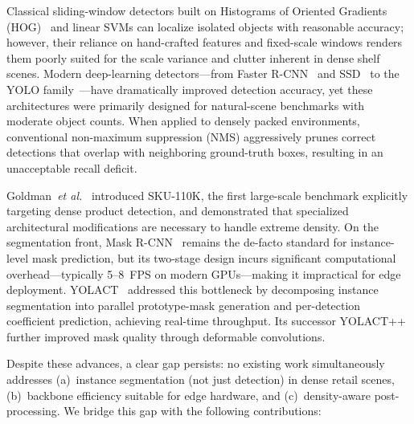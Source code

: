\documentclass[conference]{IEEEtran}
\newcommand{\etal}{\emph{et al.}}
\begin{document}
Classical sliding-window detectors built on Histograms of Oriented
Gradients (HOG)~\cite{dalal2005hog} and linear SVMs can localize isolated
objects with reasonable accuracy; however, their reliance on hand-crafted
features and fixed-scale windows renders them poorly suited for the
scale variance and clutter inherent in dense shelf scenes. Modern
deep-learning detectors---from Faster R-CNN~\cite{ren2015faster} and
SSD~\cite{liu2016ssd} to the YOLO family~\cite{redmon2016yolo}---have
dramatically improved detection accuracy, yet these architectures were
primarily designed for natural-scene benchmarks with moderate object
counts. When applied to densely packed environments, conventional
non-maximum suppression (NMS) aggressively prunes correct detections that
overlap with neighboring ground-truth boxes, resulting in an unacceptable
recall deficit.

Goldman~\etal~\cite{goldman2019dense} introduced SKU-110K, the first
large-scale benchmark explicitly targeting dense product detection, and
demonstrated that specialized architectural modifications are necessary to
handle extreme density. On the segmentation front, Mask
R-CNN~\cite{he2017mask} remains the de-facto standard for instance-level
mask prediction, but its two-stage design incurs significant computational
overhead---typically 5--8~FPS on modern GPUs---making it impractical for
edge deployment. YOLACT~\cite{bolya2019yolact} addressed this bottleneck
by decomposing instance segmentation into parallel prototype-mask
generation and per-detection coefficient prediction, achieving real-time
throughput. Its successor YOLACT++~\cite{bolya2020yolact} further improved
mask quality through deformable convolutions.

Despite these advances, a clear gap persists: no existing work
simultaneously addresses (a)~instance segmentation (not just detection) in
dense retail scenes, (b)~backbone efficiency suitable for edge hardware,
and (c)~density-aware post-processing. We bridge this gap with the
following contributions:
\end{document}
